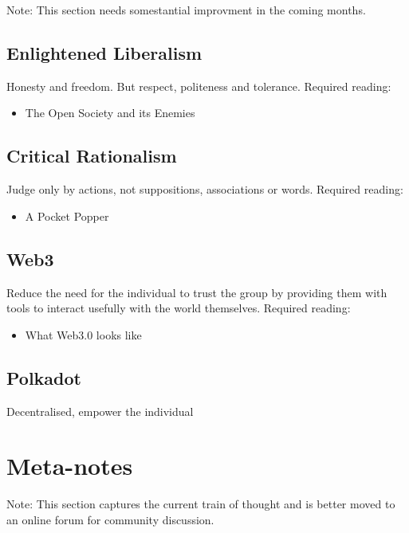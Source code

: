 \documentclass[9pt,oneside]{amsart}
\begin{document}
Note: This section needs somestantial improvment in the coming months.

\subsection{Enlightened Liberalism}\label{enlightened-liberalism}

Honesty and freedom. But respect, politeness and tolerance. Required reading:

\begin{itemize}
\item
  The Open Society and its Enemies
\end{itemize}

\subsection{Critical Rationalism}\label{critical-rationalism}

Judge only by actions, not suppositions, associations or words. Required reading:

\begin{itemize}
\item
  A Pocket Popper
\end{itemize}

\subsection{Web3}\label{web3}

Reduce the need for the individual to trust the group by providing them with tools to interact usefully with the world themselves. Required reading:

\begin{itemize}
\item
  What Web3.0 looks like
\end{itemize}

\subsection{Polkadot}\label{polkadot}

Decentralised, empower the individual

\section{Meta-notes}\label{meta-notes}

Note: This section captures the current train of thought and is better moved to an online forum for community discussion.
\end{document}
